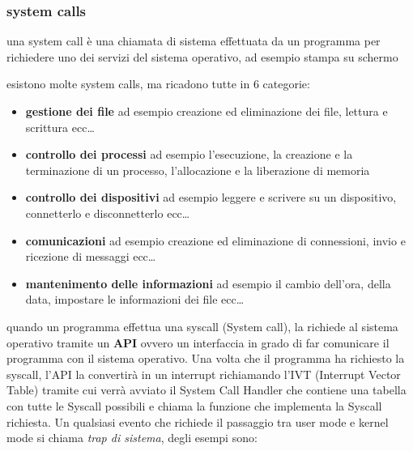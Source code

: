 \documentclass{article}
\begin{document}
    \subsubsection{system calls}
        \label{sec:syscall}
            \begin{tcolorbox}[colback= green!10!white, colframe= green!40!black, title=System Calls]

                una system call è una chiamata di sistema effettuata da un programma per richiedere uno dei servizi del sistema operativo, ad esempio stampa su schermo
            \end{tcolorbox}
        esistono molte system calls, ma ricadono tutte in 6 categorie:
        \begin{itemize}
            \item \textbf{gestione dei file}
            ad esempio creazione ed eliminazione dei file, lettura e scrittura ecc\ldots

            \item \textbf{controllo dei processi}
            ad esempio l'esecuzione, la creazione e la terminazione di un processo, l'allocazione e la liberazione di memoria

            \item \textbf{controllo dei dispositivi}
            ad esempio leggere e scrivere su un dispositivo, connetterlo e disconnetterlo ecc\ldots

            \item \textbf{comunicazioni}
            ad esempio creazione ed eliminazione di connessioni, invio e ricezione di messaggi ecc\ldots
            
            \item \textbf{mantenimento delle informazioni}
            ad esempio il cambio dell'ora, della data, impostare le informazioni dei file ecc\ldots
        \end{itemize}
        quando un programma effettua una syscall (System call), la richiede al sistema operativo tramite un \textbf{API} ovvero un interfaccia in grado di far comunicare il programma con il sistema operativo.
        Una volta che il programma ha richiesto la syscall, l'API la convertirà in un interrupt richiamando l'IVT (Interrupt Vector Table) tramite cui verrà avviato il System Call Handler che contiene una tabella con tutte le Syscall possibili e chiama la funzione che implementa la Syscall richiesta.
        Un qualsiasi evento che richiede il passaggio tra user mode e kernel mode si chiama \textit{trap di sistema}, degli esempi sono:
\end{document}
